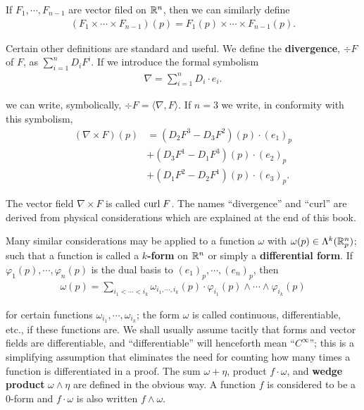 If $F_1,\cdots,F_{n-1}$ are vector filed on $\mathbb{R}^n$, then we can 
similarly define 
\begin{align*}
  (F_1\times\cdots\times F_{n-1})(p) = F_1(p)\times\cdots\times F_{n-1}(p).
\end{align*}

Certain other definitions are standard and useful. We define the \textbf{divergence}, 
$\div F$ of $F$, as $\sum_{i=1}^{n}{D_iF^i}$. If we introduce the formal symbolism
\begin{align*}
    \nabla = \sum_{i=1}^{n}{D_i\cdot e_i}.
\end{align*}

we can write, symbolically, $\div F = \langle \nabla, F\rangle$. If $n=3$
we write, in conformity with this symbolism,
\begin{align*}
    (\nabla\times F)(p) 
    & = (D_2F^3 - D_3F^2)(p)\cdot (e_1)_p \\
    & + (D_3F^1 - D_1F^3)(p)\cdot (e_2)_p \\
    & + (D_1F^2 - D_2F^1)(p)\cdot (e_3)_p.
\end{align*}

The vector field $\nabla\times F$ is called $\mathrm{curl}\; F$.
The names ``divergence'' and ``curl'' are derived from physical considerations
which are explained at the end of this book. 

Many similar considerations may be applied to a function $\omega$ with 
$\omega(p)\in \Lambda^k(\mathbb{R}^n_p)$; such that a function is called a 
$k$\textbf{-form} on $\mathbb{R}^n$ or simply a \textbf{differential form}.
If $\varphi_1(p),\cdots,\varphi_n(p)$ is the dual basis to $(e_1)_p,\cdots,(e_n)_p$, then 
\begin{align*}
  \omega(p) = \sum_{i_1<\cdots<i_k}{\omega_{i_1,\cdots,i_k}(p)\cdot \varphi_{i_1}(p)\wedge\cdots\wedge\varphi_{i_k}(p)}
\end{align*}

for certain functions $\omega_{i_1},\cdots,\omega_{i_k}$; the form $\omega$ 
is called continuous, differentiable, etc., if these functions are.
We shall usually assume tacitly that forms and vector fields are differentiable,
and ``differentiable'' will henceforth mean ``$C^\infty$''; this is a
simplifying assumption that eliminates the need for counting
how many times a function is differentiated in a proof.
The sum $\omega+\eta$, product $f \cdot \omega$, and \textbf{wedge product}
$\omega\wedge\eta$ are defined in the obvious way. A function $f$ is 
considered to be a 0-form and $f\cdot \omega$ is also written $f\wedge\omega$.

